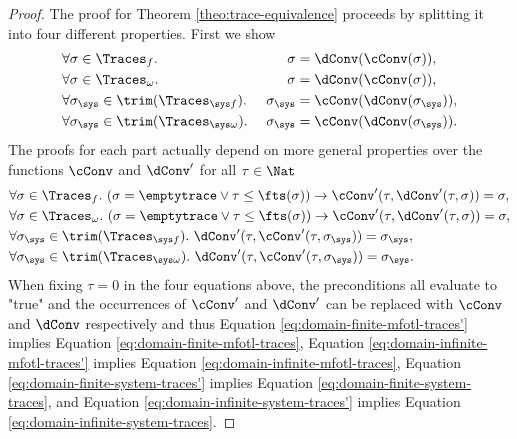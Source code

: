 \begin{proof}
    \label{proof:trace-equivalence}
    The proof for Theorem \ref{theo:trace-equivalence}
    proceeds by splitting it into four different properties.
    First we show
    \begin{align}
        \label{eq:domain-finite-mfotl-traces}
        &\forall \sigma \in \Traces_f .~
        &\sigma
        &=\dConv(\cConv(\sigma)),
        \\
        \label{eq:domain-infinite-mfotl-traces}
        &\forall \sigma \in \Traces_\omega .~
        &\sigma
        &=\dConv(\cConv(\sigma)),
        \\
        \label{eq:domain-finite-system-traces}
        &\forall \sigma_\sys \in \trim(\Traces_{\sys f}) .~
        &\sigma_\sys 
        &=\cConv(\dConv(\sigma_\sys)),
        \\
        \label{eq:domain-infinite-system-traces}
        &\forall \sigma_\sys \in \trim(\Traces_{\sys \omega}) .~
        &\sigma_\sys 
        &=\cConv(\dConv(\sigma_\sys)).
    \end{align}
    The proofs for each part actually depend on more general properties
    over the functions $\cConv$ and $\dConv'$ for all $\tau \in \Nat$
    \begin{align}
        \label{eq:domain-finite-mfotl-traces'}
        &\forall \sigma \in \Traces_f .~
        ( \sigma = \emptytrace \vee  \tau \leq \fts(\sigma) )
        \to 
        \cConv'(\tau, \dConv'(\tau, \sigma)) = \sigma,
        \\
        \label{eq:domain-infinite-mfotl-traces'}
        &\forall \sigma \in \Traces_\omega .~
        ( \sigma = \emptytrace \vee  \tau \leq \fts(\sigma) )
        \to 
        \cConv'(\tau, \dConv'(\tau, \sigma)) = \sigma,
        \\
        \label{eq:domain-finite-system-traces'}
        &\forall \sigma_\sys \in \trim(\Traces_{\sys f}) .~
        \dConv'(\tau, \cConv'(\tau, \sigma_\sys)) = \sigma_\sys,
        \\
        \label{eq:domain-infinite-system-traces'}
        &\forall \sigma_\sys \in \trim(\Traces_{\sys \omega}) .~
        \dConv'(\tau, \cConv'(\tau, \sigma_\sys)) = \sigma_\sys.
    \end{align}
    When fixing $\tau=0$ in the four equations above, the preconditions
    all evaluate to "true" and the occurrences of $\cConv'$ and $\dConv'$
    can be replaced with $\cConv$ and $\dConv$ respectively and thus
    Equation \ref{eq:domain-finite-mfotl-traces'} implies
    Equation \ref{eq:domain-finite-mfotl-traces},
    Equation \ref{eq:domain-infinite-mfotl-traces'} implies
    Equation \ref{eq:domain-infinite-mfotl-traces},
    Equation \ref{eq:domain-finite-system-traces'} implies
    Equation \ref{eq:domain-finite-system-traces}, and
    Equation \ref{eq:domain-infinite-system-traces'} implies
    Equation \ref{eq:domain-infinite-system-traces}.


\end{proof}

